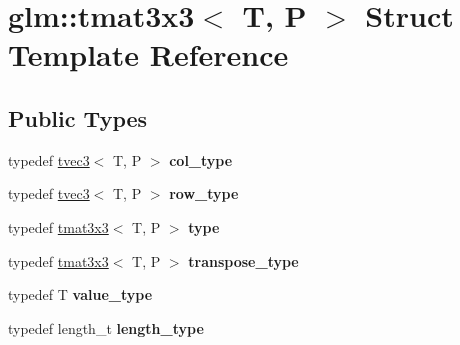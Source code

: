 \hypertarget{structglm_1_1tmat3x3}{\section{glm\-:\-:tmat3x3$<$ T, P $>$ Struct Template Reference}
\label{structglm_1_1tmat3x3}
}
\subsection*{Public Types}
\begin{DoxyCompactItemize}
\item 
\hypertarget{structglm_1_1tmat3x3_a0b80bddb3cb4e01aa04d1c7a5a47365a}{typedef \hyperlink{structglm_1_1tvec3}{tvec3}$<$ T, P $>$ {\bfseries col\-\_\-type}}\label{structglm_1_1tmat3x3_a0b80bddb3cb4e01aa04d1c7a5a47365a}

\item 
\hypertarget{structglm_1_1tmat3x3_a98418fd5ee5f7d505a08b913086d8d25}{typedef \hyperlink{structglm_1_1tvec3}{tvec3}$<$ T, P $>$ {\bfseries row\-\_\-type}}\label{structglm_1_1tmat3x3_a98418fd5ee5f7d505a08b913086d8d25}

\item 
\hypertarget{structglm_1_1tmat3x3_a0c427c28a6ca62343de768023cd69bf4}{typedef \hyperlink{structglm_1_1tmat3x3}{tmat3x3}$<$ T, P $>$ {\bfseries type}}\label{structglm_1_1tmat3x3_a0c427c28a6ca62343de768023cd69bf4}

\item 
\hypertarget{structglm_1_1tmat3x3_ac27e769fb5ed861068079f433a1d5b8f}{typedef \hyperlink{structglm_1_1tmat3x3}{tmat3x3}$<$ T, P $>$ {\bfseries transpose\-\_\-type}}\label{structglm_1_1tmat3x3_ac27e769fb5ed861068079f433a1d5b8f}

\item 
\hypertarget{structglm_1_1tmat3x3_a90013767ff8a88d1ec5dd54574579669}{typedef T {\bfseries value\-\_\-type}}\label{structglm_1_1tmat3x3_a90013767ff8a88d1ec5dd54574579669}

\item 
\hypertarget{structglm_1_1tmat3x3_a78fa6e6e406213fa0049b5125b2686b5}{typedef length\-\_\-t {\bfseries length\-\_\-type}}\label{structglm_1_1tmat3x3_a78fa6e6e406213fa0049b5125b2686b5}

\end{DoxyCompactItemize}
